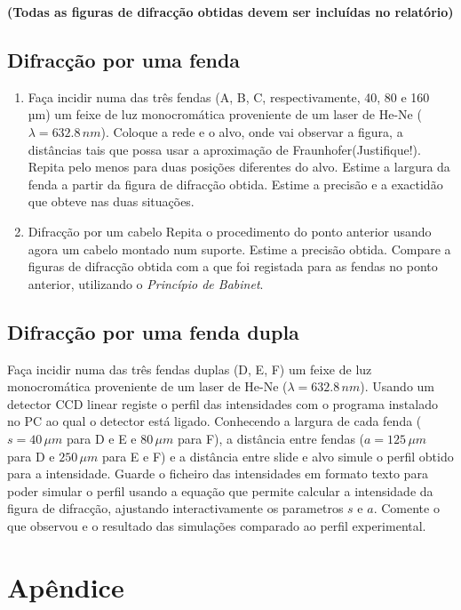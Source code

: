 \documentclass[a4paper,12pt]{article}
\begin{document}
{\bf (Todas as figuras de difracção obtidas devem ser incluídas no relatório)}

\subsection{\sf Difracção por uma fenda}

\begin{enumerate}
\item Faça incidir numa das três fendas (A, B, C, respectivamente, 40, 80 e 160 µm) um 
feixe de luz monocromática proveniente de um laser de He-Ne ($\lambda=632.8\,nm$).  
Coloque a rede e o alvo, onde vai observar a figura, a distâncias tais que possa usar 
a aproximação de Fraunhofer(Justifique!). 
Repita pelo menos para duas posições diferentes do 
alvo.  
Estime a largura da fenda a partir da figura de difracção obtida.  
Estime a precisão e a exactidão que obteve nas duas situações. 
 
\item Difracção por um cabelo
Repita  o  procedimento  do  ponto  anterior  usando  agora  um  cabelo  montado  num 
suporte.  
Estime a precisão obtida.  
Compare  a  figuras  de  difracção  obtida  com  a  que  foi  registada  para  as  fendas  no 
ponto anterior, utilizando o \emph{Princípio de Babinet}.
\end{enumerate}

\subsection{\sf Difracção por uma fenda dupla}
 
Faça incidir numa das três fendas duplas (D, E, F) um feixe de luz monocromática 
proveniente de um laser de He-Ne ($\lambda=632.8\,nm$).  
Usando um detector CCD linear registe o perfil das intensidades com o programa instalado 
no PC ao qual o detector está ligado. Conhecendo a largura de cada fenda ($s=40\, 
\mu m$ para D e E e $80\,\mu m$ para F), a distância entre fendas ($a=125\,\mu m$ para D e 
$250\,\mu m$  para  E  e  F) e a distância entre slide e alvo  simule  o  perfil  obtido  para  a  intensidade.  Guarde  o  ficheiro  das 
intensidades  em  formato  texto  para  poder  simular  o  perfil  usando  a  equação  que 
permite calcular a intensidade da figura de difracção, ajustando interactivamente os parametros $s$ e $a$. 
Comente  o  que  observou  e  o  resultado  das  simulações  comparado  ao  perfil 
experimental. 

\section{\sf Apêndice}
\end{document}
